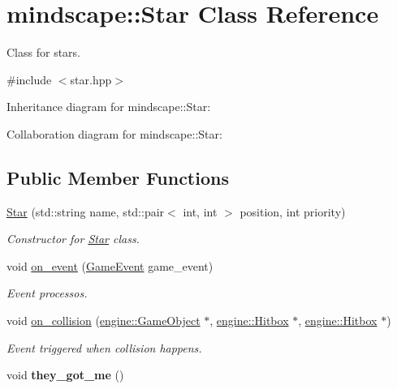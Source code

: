\hypertarget{classmindscape_1_1_star}{}\section{mindscape\+:\+:Star Class Reference}
\label{classmindscape_1_1_star}


Class for stars.  




{\ttfamily \#include $<$star.\+hpp$>$}



Inheritance diagram for mindscape\+:\+:Star\+:


Collaboration diagram for mindscape\+:\+:Star\+:
\subsection*{Public Member Functions}
\begin{DoxyCompactItemize}
\item 
\hyperlink{classmindscape_1_1_star_ab783f62c3988243dd7f50eab2499c181}{Star} (std\+::string name, std\+::pair$<$ int, int $>$ position, int priority)
\begin{DoxyCompactList}\small\item\em Constructor for \hyperlink{classmindscape_1_1_star}{Star} class. \end{DoxyCompactList}\item 
void \hyperlink{classmindscape_1_1_star_a6a9316e0d1ca0e8f2fb407d0c67b61ce}{on\+\_\+event} (\hyperlink{class_game_event}{Game\+Event} game\+\_\+event)
\begin{DoxyCompactList}\small\item\em Event processos. \end{DoxyCompactList}\item 
void \hyperlink{classmindscape_1_1_star_ad52e47751352be18a89aea676d3753c5}{on\+\_\+collision} (\hyperlink{classengine_1_1_game_object}{engine\+::\+Game\+Object} $\ast$, \hyperlink{classengine_1_1_hitbox}{engine\+::\+Hitbox} $\ast$, \hyperlink{classengine_1_1_hitbox}{engine\+::\+Hitbox} $\ast$)
\begin{DoxyCompactList}\small\item\em Event triggered when collision happens. \end{DoxyCompactList}\item 
void {\bfseries they\+\_\+got\+\_\+me} ()\hypertarget{classmindscape_1_1_star_a7d9082a463089da7be60a85a33b57538}{}\label{classmindscape_1_1_star_a7d9082a463089da7be60a85a33b57538}

\end{DoxyCompactItemize}
